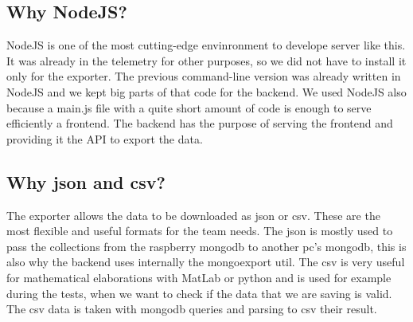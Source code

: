 \subsection{Why NodeJS?}
NodeJS is one of the most cutting-edge envinronment to develope server like this. 
It was already in the telemetry for other purposes, so we did not have to install it only for the exporter.
The previous command-line version was already written in NodeJS and we kept big parts of that code for the backend.
We used NodeJS also because a main.js file with a quite short amount of code is enough to serve efficiently a frontend.
The backend has the purpose of serving the frontend and providing it the API to export the data.

\subsection{Why json and csv?}
The exporter allows the data to be downloaded as json or csv. These are the most flexible and useful formats for the team needs.
The json is mostly used to pass the collections from the raspberry mongodb to another pc's mongodb, 
this is also why the backend uses internally the mongoexport util. 
The csv is very useful for mathematical elaborations with MatLab or python and is used for example during the tests, 
when we want to check
if the data that we are saving is valid. The csv data is taken with mongodb queries and parsing to csv their result.